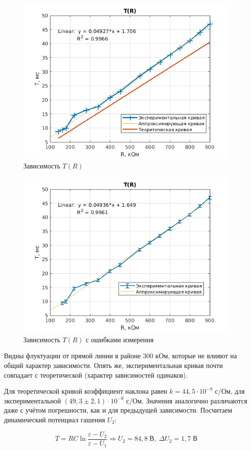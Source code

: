 \begin{figure}[h!]
    \centering
    \includegraphics[width = 10 cm]{images/TR.png}
    \caption{Зависимость $T(R)$}
    \label{TR}
\end{figure}

\begin{figure}[h!]
    \centering
    \includegraphics[width = 10 cm]{images/TR2.png}
    \caption{Зависимость $T(R)$ с ошибками измерения}
    \label{TR2}
\end{figure}

Видны флуктуации от прямой линии в районе $300$ кОм, которые не влияют на общий характер зависимости. Опять же, экспериментальная кривая почти совпадает с теоретической (характер зависимостей одинаков).

Для теоретической кривой коэффициент наклона равен $k = 44,5 \cdot 10^{-9}$ с/Ом, для экспериментальной $(49,3 \pm 2,1) \cdot 10^{-9}$ с/Ом. Значения аналогично различаются даже с учётом погрешности, как и для предыдущей зависимости. Посчитаем динамический потенциал гашения $U_2$:

\begin{equation}
    T = RC \ln{\frac{\varepsilon - U_2}{\varepsilon - U_1}} \Rightarrow U_2 = 84,8 \; \text{В}, \; \Delta U_2 = 1,7 \; \text{В}
\end{equation}

